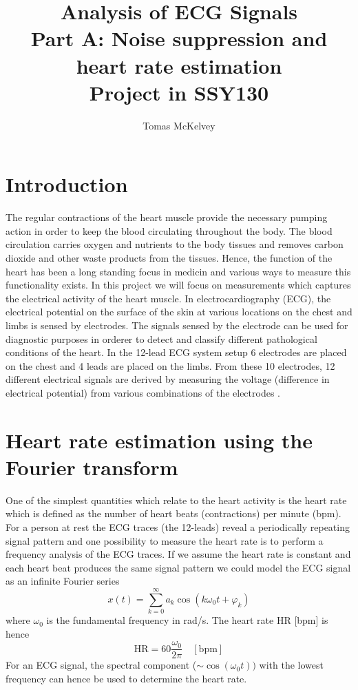 \documentclass[12pt]{article}
\begin{document}
\title{Analysis of ECG Signals \\ Part A: Noise suppression and heart rate
  estimation \\ Project in SSY130 }
\author{Tomas McKelvey}

\maketitle{}
\section{Introduction}
\label{sec:introduction}
The regular contractions of the heart muscle provide the necessary pumping action in order to keep the blood circulating throughout the body. The blood circulation carries oxygen and nutrients to the body tissues and removes carbon dioxide and other waste products from the tissues.
Hence, the function of the heart has been a long standing focus in medicin and various ways to measure this functionality exists. In this project we will focus on measurements which captures the electrical activity of the heart muscle. In electrocardiography (ECG), the electrical potential on the surface of the skin at various locations on the chest and limbs is sensed by electrodes. The signals sensed by the electrode can be used for diagnostic purposes in orderer to detect and classify different pathological conditions of the heart. In the 12-lead ECG system setup 6 electrodes are placed on the chest and 4 leads are placed on the limbs. From these 10 electrodes, 12 different electrical signals are derived by measuring the voltage (difference in electrical potential) from various combinations of the electrodes \cite{cablesandsensors12LeadECGPlacement}.    

\section{Heart rate estimation using the Fourier transform}
One of the simplest quantities which relate to the heart activity is the heart rate which is defined as the number of heart beats (contractions) per minute (bpm). For a person at rest the ECG traces (the 12-leads) reveal a periodically repeating signal pattern and one possibility to measure the heart rate is to perform a frequency analysis of the ECG traces. If we assume the heart rate is constant and each heart beat produces the same signal pattern we could model the ECG signal as an infinite Fourier series
\begin{equation}
  \label{eq:1}
   x(t) = \sum_{k=0}^{\infty} a_k  \cos( k \omega_0 t + \varphi_k)
\end{equation}
where $\omega_0$ is the fundamental frequency in rad/s. The heart rate $\mathrm{HR}$ [bpm] is hence
\begin{equation}
  \label{eq:2}
  \mathrm{HR} = 60 \frac{\omega_0}{2\pi} \quad [\text{bpm}]
\end{equation}
For an ECG signal, the spectral component ($\sim \cos(\omega_0t) )$ with the lowest frequency can hence be used to determine the heart rate.
\end{document}
